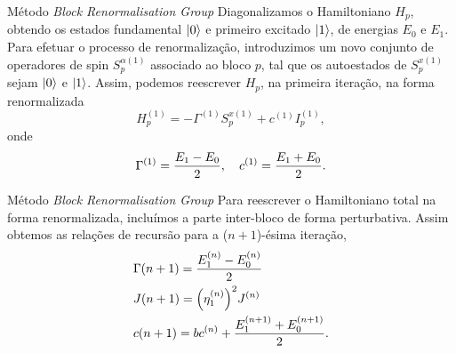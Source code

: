\documentclass[brazil]{beamer}
\begin{document}
\begin{frame}{Método \textit{Block Renormalisation Group}}
    Diagonalizamos o Hamiltoniano \( H_p \), obtendo os estados fundamental \( \ket{0} \)
    e primeiro excitado \( \ket{1} \), de energias \( E_0 \) e \( E_1 \).
    Para efetuar o processo de renormalização, introduzimos um novo conjunto de operadores de spin \( S_p^{\alpha (1)} \)
    associado ao bloco \( p \), tal que os autoestados de \( S_p^{x (1)} \) sejam \( \ket{0} \) e \( \ket{1} \).
    Assim, podemos reescrever \( H_p \), na primeira iteração, na forma renormalizada
    \begin{equation}
        H_p^{(1)} = - \Gamma^{(1)} S_p^{x (1)} + c^{(1)} I_p^{(1)} ,
    \end{equation}
    onde
    \begin{equation}
        \Gamma^{(1)} = \frac{E_1 - E_0}{2} \qc c^{(1)} = \frac{E_1 + E_0}{2} .
    \end{equation}
\end{frame}

\begin{frame}{Método \textit{Block Renormalisation Group}}
    Para reescrever o Hamiltoniano total na forma renormalizada, incluímos a parte inter-bloco de forma perturbativa.
    Assim obtemos as relações de recursão para a (\( n + 1 \))-ésima iteração,
    \begin{align}
         & \Gamma (n + 1) = \frac{E_1^{(n)} - E_0^{(n)}}{2}                 \\
         & J (n + 1) = \qty( \eta_1^{(n)} )^2 J^{(n)}                       \\
         & c(n + 1) = b c^{(n)} + \frac{E_1^{(n + 1)} + E_0^{(n + 1)}}{2} .
    \end{align}
\end{frame}
\end{document}
